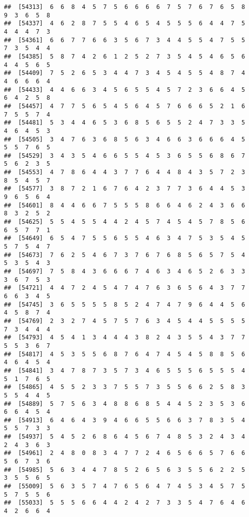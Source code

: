 \documentclass[
]{book}
\begin{document}
\begin{verbatim}
##  [54313]  6  6  8  4  5  7  5  6  6  6  6  7  5  7  6  7  6  5  8  9  3  6  5  8
##  [54337]  4  6  2  8  7  5  5  4  6  5  4  5  5  5  6  4  4  7  5  4  4  4  7  3
##  [54361]  6  6  7  7  6  6  3  5  6  7  3  4  4  5  5  4  7  5  5  7  3  5  4  4
##  [54385]  5  8  7  4  2  6  1  2  5  2  7  3  5  4  5  4  6  5  6  4  4  5  6  5
##  [54409]  7  5  2  6  5  3  4  4  7  3  4  5  4  5  5  4  8  7  4  4  6  6  6  4
##  [54433]  4  4  6  6  3  4  5  6  5  5  4  5  7  2  3  6  6  4  5  6  4  2  5  8
##  [54457]  4  7  7  5  6  5  4  5  6  4  5  7  6  6  6  5  2  1  6  7  5  5  7  4
##  [54481]  5  3  4  4  6  5  3  6  8  5  6  5  5  2  4  7  3  3  5  4  6  4  5  3
##  [54505]  3  4  7  6  3  6  8  5  6  3  4  6  6  3  6  6  6  4  5  5  5  7  6  5
##  [54529]  3  4  3  5  4  6  6  5  5  4  5  3  6  5  5  6  8  6  7  5  6  2  3  5
##  [54553]  4  7  8  6  4  4  3  7  7  6  4  4  8  4  3  5  7  2  3  8  5  4  5  7
##  [54577]  3  8  7  2  1  6  7  6  4  2  3  7  7  3  6  4  4  5  3  9  6  5  6  4
##  [54601]  8  4  4  6  6  7  5  5  5  8  6  6  4  6  2  4  3  6  6  8  3  2  5  2
##  [54625]  5  5  4  5  5  4  4  2  4  5  7  4  5  4  5  7  8  5  6  6  5  7  7  1
##  [54649]  6  5  4  7  5  5  6  5  5  4  6  3  4  7  5  3  5  4  5  5  7  5  4  7
##  [54673]  7  6  2  5  4  6  7  3  7  6  7  6  8  5  6  5  7  5  4  5  3  5  4  3
##  [54697]  7  5  8  4  3  6  6  6  7  4  6  3  4  6  5  2  6  3  3  3  6  7  5  3
##  [54721]  4  4  7  2  4  5  4  7  4  7  6  3  6  5  6  4  3  7  7  6  6  3  4  5
##  [54745]  3  6  5  5  5  5  8  5  2  4  7  4  7  9  6  4  4  5  6  4  5  8  7  4
##  [54769]  2  3  2  7  4  5  7  5  7  6  3  4  5  4  4  5  5  5  5  7  3  4  4  4
##  [54793]  4  5  4  1  3  4  4  4  3  8  2  4  3  5  5  4  3  7  7  5  5  3  6  7
##  [54817]  4  5  3  5  5  6  8  7  6  4  7  4  5  4  5  8  8  5  6  4  6  4  5  4
##  [54841]  3  4  7  8  7  3  5  7  3  4  6  5  5  5  6  5  5  5  4  5  1  7  6  5
##  [54865]  4  5  5  2  3  3  7  5  5  7  3  5  5  6  6  2  5  8  3  5  5  4  4  5
##  [54889]  5  7  5  6  3  4  8  8  6  8  5  4  4  5  2  3  5  3  6  6  6  4  5  4
##  [54913]  6  4  6  4  3  9  4  6  6  5  5  6  6  3  7  8  3  5  4  5  5  7  3  3
##  [54937]  5  4  5  2  6  8  6  4  5  6  7  4  8  5  3  2  4  3  4  2  4  3  6  3
##  [54961]  2  4  8  0  8  3  4  7  7  2  4  6  5  6  6  5  7  6  6  5  6  7  3  6
##  [54985]  5  6  3  4  4  7  8  5  2  6  5  6  3  5  5  6  2  2  5  3  5  5  6  5
##  [55009]  5  6  3  5  7  4  7  6  5  6  4  7  4  5  3  4  5  7  5  5  7  5  5  6
##  [55033]  5  5  5  6  6  4  4  2  4  2  7  3  3  5  4  7  6  4  6  4  2  6  6  4

\end{verbatim}
\end{document}
